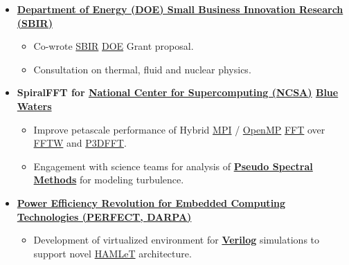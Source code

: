 \documentclass{article}
\begin{document}
\begin{itemize}
\begin{itemize}

  \end{itemize}

\item \textbf{\href{http://science.energy.gov/sbir/}{Department of Energy (DOE) Small Business Innovation Research (SBIR)}}

  \begin{itemize}
    \item Co-wrote \href{https://www.sbir.gov/about/about-sbir}{SBIR} \href{http://science.energy.gov/sbir/}{DOE} Grant proposal. 
    \item Consultation on thermal, fluid and nuclear physics.
  \end{itemize}

\item \textbf{SpiralFFT for \href{http://www.ncsa.illinois.edu}{National Center for Supercomputing  (NCSA)} \href{http://www.ncsa.illinois.edu/enabling/bluewaters}{Blue Waters}}

  \begin{itemize}
    \item Improve petascale performance of Hybrid \href{http://en.wikipedia.org/wiki/Message_Passing_Interface}{MPI} / \href{http://en.wikipedia.org/wiki/OpenMP}{OpenMP} \href{https://en.wikipedia.org/wiki/Fast_Fourier_transform}{FFT} over \href{http://www.fftw.org/}{FFTW} and \href{https://code.google.com/p/p3dfft/}{P3DFFT}.   
    \item Engagement with science teams for analysis of \textbf{\href{https://en.wikipedia.org/wiki/Pseudo-spectral_method}{Pseudo Spectral Methods}} for modeling turbulence. 
  \end{itemize}
  
\item \textbf{\href{http://www.darpa.mil/Our_Work/MTO/Programs/Power_Efficiency_Revolution_for_Embedded_Computing_Technologies_(PERFECT).aspx}{Power Efficiency Revolution for Embedded Computing Technologies (PERFECT, \href{http://www.darpa.mil/default.aspx}{DARPA})}}

  \begin{itemize}
    \item Development of virtualized environment for \textbf{\href{https://en.wikipedia.org/wiki/Verilog}{Verilog}} simulations to support novel \href{http://www.contrib.andrew.cmu.edu/~bakin/publ.html}{HAMLeT} architecture.
  \end{itemize}


\end{itemize}
\end{document}
